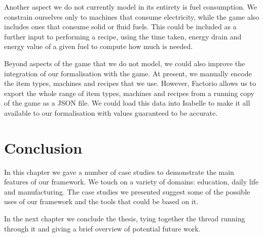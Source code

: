 \documentclass[class=smolathesis,crop=false]{standalone}
\begin{document}
Another aspect we do not currently model in its entirety is fuel consumption.
We constrain ourselves only to machines that consume electricity, while the game also includes ones that consume solid or fluid fuels.
This could be included as a further input to performing a recipe, using the time taken, energy drain and energy value of a given fuel to compute how much is needed.

Beyond aspects of the game that we do not model, we could also improve the integration of our formalisation with the game.
At present, we manually encode the item types, machines and recipes that we use.
However, Factorio allows us to export the whole range of item types, machines and recipes from a running copy of the game as a JSON file.
We could load this data into Isabelle to make it all available to our formalisation with values guaranteed to be accurate.

\section{Conclusion}
\label{sec:cases/conc}

In this chapter we gave a number of case studies to demonstrate the main features of our framework.
We touch on a variety of domains: education, daily life and manufacturing.
The case studies we presented suggest some of the possible uses of our framework and the tools that could be based on it.

In the next chapter we conclude the thesis, tying together the thread running through it and giving a brief overview of potential future work.

\ifstandalone


\fi
\end{document}
